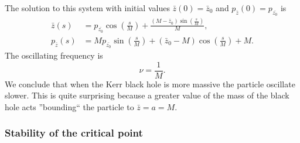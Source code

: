 The solution to this system with initial values $\bar z(0)=\bar{z}_0$ and $p_{\bar{z}}(0)=p_{\bar{z_0}}$ is
\begin{align}
 \bar z(s)&=p_{\bar{z_0}} \cos \left(\frac{s}{M}\right)+\frac{(M-\bar{z}_0) \sin \left(\frac{s}{M}\right)}{M},\\
 p_{\bar{z}}(s)&= M p_{\bar{z_0}} \sin \left(\frac{s}{M}\right)+(\bar{z}_0-M) \cos \left(\frac{s}{M}\right)+M.
\end{align}
The oscillating frequency is
\begin{equation}
 \nu=\frac{1}{M}.
\end{equation}
We conclude that when the Kerr black hole is more massive the particle oscillate slower. This is quite surprising because a greater value of the mass of the black hole acts ''bounding`` the particle to $\bar z=a=M$.

\subsubsection{Stability of the critical point}

